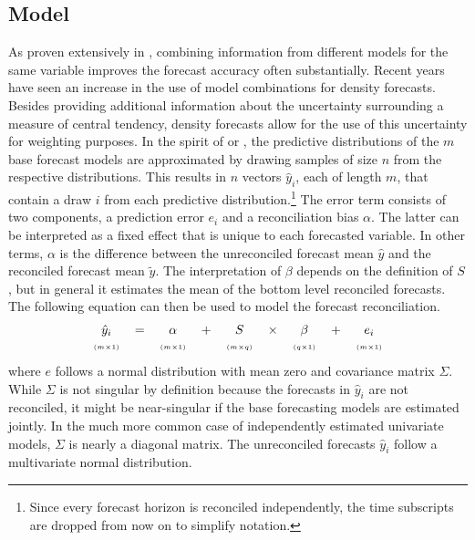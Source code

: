 \documentclass[a4paper,fleqn,11pt]{article}
\begin{document}
\subsection{Model}
As proven extensively in \cite{Timmermann2006}, combining information from different models for the same variable improves the forecast accuracy often substantially. Recent years have seen an increase in the use of model combinations for density forecasts. Besides providing additional information about the uncertainty surrounding a measure of central tendency, density forecasts allow for the use of this uncertainty for weighting purposes. In the spirit of \cite{Kapetanios2015} or \cite{Cesur2016}, the predictive distributions of the $m$ base forecast models are approximated by drawing samples of size $n$ from the respective distributions. This results in $n$ vectors $\hat{y}_{i}$, each of length $m$, that contain a draw $i$ from each predictive distribution.\footnote{Since every forecast horizon is reconciled independently, the time subscripts are dropped from now on to simplify notation.} The error term consists of two components, a prediction error $e_{i}$ and a reconciliation bias $\alpha$. The latter can be interpreted as a fixed effect that is unique to each forecasted variable. In other terms, $\alpha$ is the difference between the unreconciled forecast mean $\hat{y}$ and the reconciled forecast mean $\tilde{y}$. The interpretation of $\beta$ depends on the definition of $S$, but in general it estimates the mean of the bottom level reconciled forecasts. The following equation can then be used to model the forecast reconciliation.
\begin{align}
\label{eq:main}
\begin{tabular}{ccccccccc}
	$\hat{y}_i$ & $=$ & $\alpha$ & + &$S$ & $\times$ & $\beta$ & $+$ & $e_i$ \\
	$\scriptscriptstyle (m\times 1)$ & & $\scriptscriptstyle (m\times 1)$  & & $ \scriptscriptstyle (m\times q) $ & & $\scriptscriptstyle (q\times 1)$ & & $\scriptscriptstyle (m\times 1)$
\end{tabular}
\end{align}
where $e$ follows a normal distribution with mean zero and covariance matrix $\Sigma$. While $\Sigma$ is not singular by definition because the forecasts in $\hat{y}_{i}$ are not reconciled, it might be near-singular if the base forecasting models are estimated jointly. In the much more common case of independently estimated univariate models, $\Sigma$ is nearly a diagonal matrix. The unreconciled forecasts $\hat{y}_{i}$ follow a multivariate normal distribution.
\end{document}

